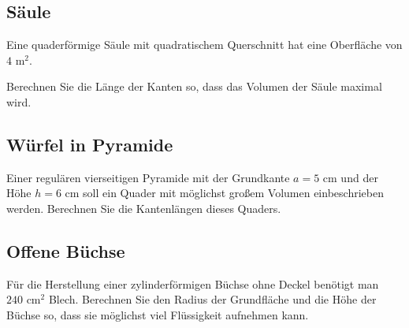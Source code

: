 

\subsection{Säule}

Eine quaderförmige Säule mit quadratischem Querschnitt hat eine Oberfläche von $4 \text{ m}^2$.

Berechnen Sie die Länge der Kanten so, dass das Volumen der Säule
maximal wird.


\subsection{Würfel in Pyramide}
Einer regulären vierseitigen Pyramide mit der Grundkante $a = 5$ cm und der Höhe $h = 6$ cm
soll ein Quader mit möglichst großem Volumen einbeschrieben werden.
Berechnen Sie die Kantenlängen dieses Quaders.


\subsection{Offene Büchse}
Für die Herstellung einer zylinderförmigen Büchse ohne Deckel benötigt
man $240 \text{ cm}^2$ Blech. Berechnen Sie den Radius der Grundfläche und die Höhe der Büchse so, dass sie möglichst viel Flüssigkeit aufnehmen kann.





